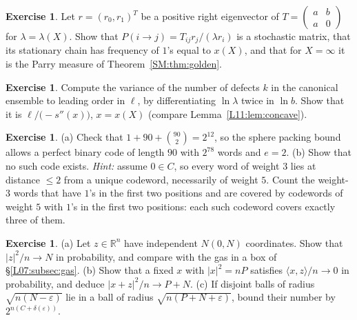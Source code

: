 \documentclass[11pt,openany]{book}
\theoremstyle{plain}
\theoremstyle{definition}
\newtheorem{exercise}[theorem]{Exercise}
\theoremstyle{remark}
\newcommand{\R}{\mathbb{R}}
\newcommand{\abs}[1]{\left\lvert #1 \right\rvert}
\newcommand{\ip}[2]{\langle #1, #2\rangle}
\begin{document}
\begin{exercise}\label{SM:ex:markov}
Let $r=(r_0,r_1)^T$ be a positive right eigenvector of $T=\left(\begin{smallmatrix}a&b\\a&0\end{smallmatrix}\right)$
for $\lambda=\lambda(X)$. Show that $P(i\to j)=T_{ij}r_j/(\lambda r_i)$ is a stochastic matrix, that its
stationary chain has frequency of $1$'s equal to $x(X)$, and that for $X=\infty$ it is the Parry measure
of Theorem~\ref{SM:thm:golden}.
\end{exercise}

\begin{exercise}
Compute the variance of the number of defects $k$ in the canonical ensemble to leading order in $\ell$, by
differentiating $\ln\lambda$ twice in $\ln b$. Show that it is $\ell\big/\!\big(-s''(x)\big)$, $x=x(X)$ (compare
Lemma~\ref{L11:lem:concave}).
\end{exercise}

\begin{exercise}
(a) Check that $1+90+\binom{90}2=2^{12}$, so the sphere packing bound allows a perfect binary code of
length $90$ with $2^{78}$ words and $e=2$. (b) Show that no such code exists. \emph{Hint:} assume
$0\in C$, so every word of weight $3$ lies at distance $\le2$ from a unique codeword, necessarily of
weight $5$. Count the weight-$3$ words that have $1$'s in the first two positions and are covered by
codewords of weight $5$ with $1$'s in the first two positions: each such codeword covers exactly three of them.
\end{exercise}

\begin{exercise}
(a) Let $z\in\R^n$ have independent $N(0,N)$ coordinates. Show that
$\abs z^2/n\to N$ in probability, and compare with the gas in a box of
\S\ref{L07:subsec:gas}. (b) Show that a fixed $x$ with $\abs x^2=nP$ satisfies $\ip xz/n\to0$ in
probability, and deduce $\abs{x+z}^2/n\to P+N$. (c) If disjoint balls of radius $\sqrt{n(N-\varepsilon)}$
lie in a ball of radius $\sqrt{n(P+N+\varepsilon)}$, bound their number by $2^{n(C+\delta(\varepsilon))}$.
\end{exercise}
\end{document}
